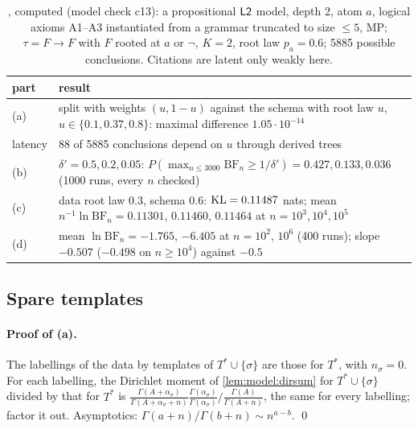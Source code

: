 \begin{table}[ht]
\centering\small
\begin{tabular}{@{}lp{11.5cm}@{}}
\toprule
part & result\\
\midrule
(a) & split with weights $(u,1-u)$ against the schema with root law $u$, $u\in\{0.1,0.37,0.8\}$: maximal difference $1.05\cdot10^{-14}$\\
latency & 88 of 5885 conclusions depend on $u$ through derived trees\\
(b) & $\delta'=0.5,0.2,0.05$: $P(\max_{n\le3000}\mathrm{BF}_n\ge1/\delta')=0.427,0.133,0.036$ (1000 runs, every $n$ checked)\\
(c) & data root law $0.3$, schema $0.6$: $\mathrm{KL}=0.11487$ nats; mean $n^{-1}\ln\mathrm{BF}_n=0.11301$, $0.11460$, $0.11464$ at $n=10^3,10^4,10^5$\\
(d) & mean $\ln\mathrm{BF}_n=-1.765$, $-6.405$ at $n=10^2$, $10^6$ (400 runs); slope $-0.507$ ($-0.498$ on $n\ge10^4$) against $-0.5$\\
\bottomrule
\end{tabular}
\caption{, computed (model check c13): a propositional $\mathord{\mathsf{L2}}$ model, depth 2, atom $a$, logical axioms A1--A3 instantiated from a grammar truncated to size $\le5$, MP; $\tau=F\to F$ with $F$ rooted at $a$ or $\neg$, $K=2$, root law $p_a=0.6$; 5885 possible conclusions. Citations are latent only weakly here.}
\label{tab:ident:c13}
\end{table}


\subsection{Spare templates}\label{app:ident:spare}

\paragraph{Proof of (a).} The labellings of the data by templates of $T^*\cup\{\sigma\}$ are those for $T^*$, with $n_\sigma=0$. For each labelling, the Dirichlet moment of \cref{lem:model:dirsum} for $T^*\cup\{\sigma\}$ divided by that for $T^*$ is $\frac{\Gamma(A+\alpha_\sigma)}{\Gamma(A+\alpha_\sigma+n)}\frac{\Gamma(\alpha_\sigma)}{\Gamma(\alpha_\sigma)}\Big/\frac{\Gamma(A)}{\Gamma(A+n)}$, the same for every labelling; factor it out. Asymptotics: $\Gamma(a+n)/\Gamma(b+n)\sim n^{a-b}$. \qed

